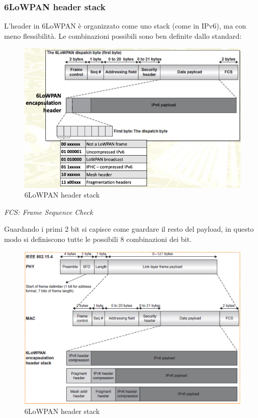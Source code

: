 \documentclass{article}
\begin{document}
\subsubsection{6LoWPAN header stack}
L'header in 6LoWPAN è organizzato come uno stack (come in IPv6), ma con meno flessibilità. Le combinazioni possibili sono ben definite dallo standard:
\begin{figure}[H]
\centering
\includegraphics[scale=0.5]{figures/6lowpan header stack.png}
\caption{6LoWPAN header stack}
\end{figure}
\begin{center}
    \textit{FCS: Frame Sequence Check}
\end{center}
Guardando i primi 2 bit si capisce come guardare il resto del payload, in questo modo si definiscono tutte le possibili 8 combinazioni dei bit.
\begin{figure}[H]
\centering
\includegraphics[scale=0.5]{figures/6lowpan header stack 2.png}
\caption{6LoWPAN header stack}
\end{figure}
\end{document}

